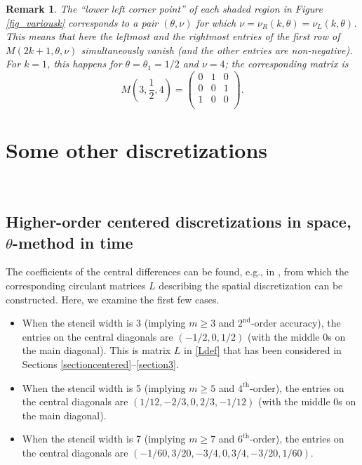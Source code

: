 \documentclass[a4paper]{article}
\newtheorem{remark}{Remark}
\newcommand{\te}{\theta}
\newcommand{\nul}{\nu_L(k,\theta)}
\newcommand{\nur}{\nu_R(k,\theta)}
\begin{document}
\begin{remark}
The ``lower left corner point'' of each shaded region in Figure \ref{fig_variousk} corresponds to a pair 
$(\te,\nu)$  for which $\nu=\nur=\nul$. This means that here the leftmost and the rightmost entries of the first row of $M(2k+1,\te,\nu)$ simultaneously vanish (and the other entries are non-negative). For $k=1$, this happens for $\te=\te_1=1/2$ and $\nu=4$; the corresponding matrix is
\begin{equation}\label{rem10thetahalfmatrix}
M\left(3,\frac{1}{2},4\right)=\left(
\begin{array}{ccc}
 0 & 1 & 0 \\
 0 & 0 & 1 \\
 1 & 0 & 0 \\
\end{array}
\right).
\end{equation}
\end{remark}






\section{Some other discretizations}\label{otherdisc}

\\



\subsection{Higher-order centered discretizations in space, $\theta$-method in time}\label{highercentered}

The coefficients of the central differences can be found, e.g., in \cite{bengt}, from which the corresponding circulant matrices $L$ describing the spatial discretization can be constructed.
Here, we examine the first few cases.
\begin{itemize}
\item When the stencil width is 3 (implying  $m\ge 3$ and $2^\text{nd}$-order accuracy), the entries on the central diagonals are $(-1/2, 0, 1/2)$ (with the middle 0s on the main diagonal). This is matrix $L$ in \eqref{Ldef} that has been considered in Sections \ref{sectioncentered}--\ref{section3}.
\item When the stencil width is 5 (implying  $m\ge 5$ and $4^\text{th}$-order), the entries on the central diagonals are $(1/12, -2/3, 0, 2/3, -1/12)$ (with the middle 0s on the main diagonal).
\item When the stencil width is 7 (implying $m\ge 7$ and $6^\text{th}$-order), the entries on the central diagonals are $(-1/60, 3/20, -3/4, 0, 3/4, -3/20, 1/60)$.
\end{itemize}
\end{document}

